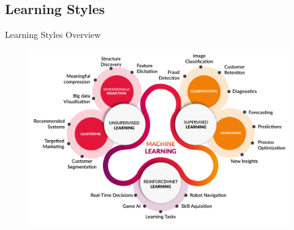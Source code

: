\documentclass[main.tex]{subfiles}
\begin{document}
    \subsection{Learning Styles}
    
    \begin{frame}{Learning Styles Overview}
        \begin{figure}
            \label{fig:learning-styles}
            \includegraphics[width=.7\textwidth]{figures/external/learning-styles.png}
        \end{figure}
    \end{frame}
\end{document}
